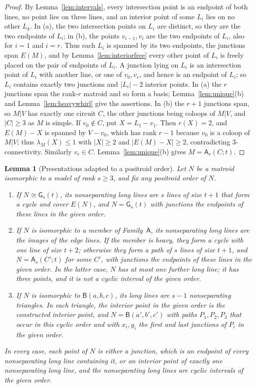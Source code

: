 \documentclass[11pt]{amsart}
\newtheorem{lemma}[theorem]{Lemma}
\theoremstyle{definition}
\theoremstyle{remark}
\numberwithin{equation}{section}
\newcommand{\lam}{\lambda}
\newcommand{\GW}{\mathsf{G}}
\newcommand{\FA}{\mathsf{A}}
\newcommand{\FB}{\mathsf{B}}
\begin{document}
\begin{proof}
By Lemma~\ref{lem:intervals}, every intersection point is an endpoint of both lines, no point lies on three lines, and an interior point of some $L_i$ lies on no other $L_k$. In (a), the two intersection points on $L_i$ are distinct, so they are the two endpoints of $L_i$; in (b), the points $v_{i-1},v_i$ are the two endpoints of $L_i$, also for $i=1$ and $i=r$. Thus each $L_i$ is spanned by its two endpoints, the junctions span $E(M)$, and by Lemma~\ref{lem:interiorfree} every other point of $L_i$ is freely placed on the pair of endpoints of $L_i$. A junction lying on $L_i$ is an intersection point of $L_i$ with another line, or one of $v_0,v_r$, and hence is an endpoint of $L_i$; so $L_i$ contains exactly two junctions and $|L_i|-2$ interior points. In (a) the $r$ junctions span the rank-$r$ matroid and so form a basis; Lemma~\ref{lem:unique}(b) and Lemma~\ref{lem:heavywhirl} give the assertions. In (b) the $r+1$ junctions span, so $M|V$ has exactly one circuit $C$, the other junctions being coloops of $M|V$, and $|C|\ge3$ as $M$ is simple. If $v_0\notin C$, put $X=L_1-v_1$. Then $r(X)=2$, and $E(M)-X$ is spanned by $V-v_0$, which has rank $r-1$ because $v_0$ is a coloop of $M|V$; thus $\lam_M(X)\le1$ with $|X|\ge2$ and $|E(M)-X|\ge2$, contradicting $3$-connectivity. Similarly $v_r\in C$. Lemma~\ref{lem:unique}(b) gives $M=\FA_r(C;t)$.
\end{proof}

\begin{lemma}[Presentations adapted to a positroid order]\label{lem:adapted}
Let $N$ be a matroid isomorphic to a model of rank $s\ge3$, and fix any positroid order of $N$.
\begin{enumerate}[label=\textup{(\alph*)}]
\item If $N\cong\GW_s(t)$, its nonseparating long lines are $s$ lines of size $t+1$ that form a cycle and cover $E(N)$, and $N=\GW_s(t)$ with junctions the endpoints of these lines in the given order.
\item If $N$ is isomorphic to a member of Family~$\FA$, its nonseparating long lines are the images of the edge lines. If the member is heavy, they form a cycle with one line of size $t+2$; otherwise they form a path of $s$ lines of size $t+1$, and $N=\FA_s(C';t)$ for some $C'$, with junctions the endpoints of these lines in the given order. In the latter case, $N$ has at most one further long line; it has three points, and it is not a cyclic interval of the given order.
\item If $N$ is isomorphic to $\FB(a,b,c)$, its long lines are $s-1$ nonseparating triangles. In each triangle, the interior point in the given order is the constructed interior point, and $N=\FB(a',b',c')$ with paths $P_1,P_2,P_3$ that occur in this cyclic order and with $x_i,y_i$ the first and last junctions of $P_i$ in the given order.
\end{enumerate}
In every case, each point of $N$ is either a junction, which is an endpoint of every nonseparating long line containing it, or an interior point of exactly one nonseparating long line, and the nonseparating long lines are cyclic intervals of the given order.
\end{lemma}
\end{document}
